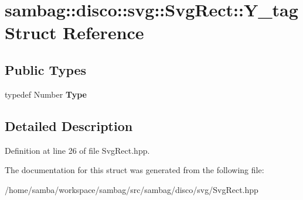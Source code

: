 \hypertarget{structsambag_1_1disco_1_1svg_1_1_svg_rect_1_1_y__tag}{
\section{sambag::disco::svg::SvgRect::Y\_\-tag Struct Reference}
\label{structsambag_1_1disco_1_1svg_1_1_svg_rect_1_1_y__tag}
}
\subsection*{Public Types}
\begin{DoxyCompactItemize}
\item 
\hypertarget{structsambag_1_1disco_1_1svg_1_1_svg_rect_1_1_y__tag_a3b6bd9e125e2f3398973beec4be6e115}{
typedef Number {\bfseries Type}}
\label{structsambag_1_1disco_1_1svg_1_1_svg_rect_1_1_y__tag_a3b6bd9e125e2f3398973beec4be6e115}

\end{DoxyCompactItemize}


\subsection{Detailed Description}


Definition at line 26 of file SvgRect.hpp.



The documentation for this struct was generated from the following file:\begin{DoxyCompactItemize}
\item 
/home/samba/workspace/sambag/src/sambag/disco/svg/SvgRect.hpp\end{DoxyCompactItemize}
